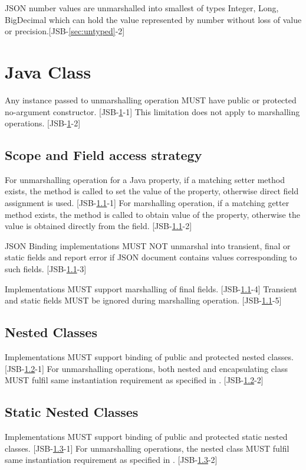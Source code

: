 JSON number values are unmarshalled into smallest of types Integer, Long, BigDecimal which can hold the value represented by number without loss of value or precision.[JSB-\ref{sec:untyped}-2]

\section{Java Class}
\label{sec:class}
Any instance passed to unmarshalling operation MUST have public or protected no-argument constructor. [JSB-\ref{sec:class}-1] This limitation does not apply to marshalling operations. [JSB-\ref{sec:class}-2]

\subsection{Scope and Field access strategy}
\label{subsec:fieldstrategy}
For unmarshalling operation for a Java property, if a matching setter method exists, the method is called to set the value of the property, otherwise direct field assignment is used. [JSB-\ref{subsec:fieldstrategy}-1] For marshalling operation, if a matching getter method exists, the method is called to obtain value of the property, otherwise the value is obtained directly from the field. [JSB-\ref{subsec:fieldstrategy}-2]

JSON Binding implementations MUST NOT unmarshal into transient, final or static fields and report error if JSON document contains values corresponding to such fields. [JSB-\ref{subsec:fieldstrategy}-3]

Implementations MUST support marshalling of final fields. [JSB-\ref{subsec:fieldstrategy}-4] Transient and static fields MUST be ignored during marshalling operation. [JSB-\ref{subsec:fieldstrategy}-5]

\subsection{Nested Classes}
\label{subsec:nestedclass}
Implementations MUST support binding of public and protected nested classes. [JSB-\ref{subsec:nestedclass}-1] For unmarshalling operations, both nested and encapsulating class  MUST fulfil same instantiation requirement as specified in . [JSB-\ref{subsec:nestedclass}-2]

\subsection{Static Nested Classes}
\label{subsec:staticnested}
Implementations MUST support binding of public and protected static nested classes. [JSB-\ref{subsec:staticnested}-1] For unmarshalling operations, the nested class MUST fulfil same instantiation requirement as specified in . [JSB-\ref{subsec:staticnested}-2]

